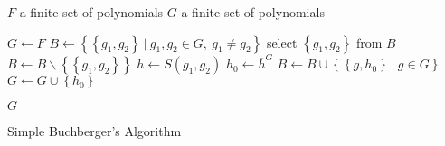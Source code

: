\begin{algorithm}[ht]
  \begin{algorithmic}[1]
    \Require
      \Statex $F$ a finite set of polynomials
    \Ensure
      \Statex $G$ a finite set of polynomials
      \Statex

    \State $G \gets F$
    \State $B \gets \left\{\left\{g_1, g_2\right\}\ |\ g_1, g_2 \in G,\ g_1 \neq g_2\right\}$
      \State select $\left\{g_1, g_2\right\}$ from $B$
      \State $B \gets B\backslash\left\{\left\{g_1, g_2\right\}\right\}$
      \State $h \gets S(g_1, g_2)$
      \State $h_0 \gets \overline{h}^G$
        \State $B \gets B \cup \left\{\left\{g, h_0\right\}\ |\ g\in G\right\}$
        \State $G \gets G \cup \left\{h_0\right\}$
      \EndIf
    \EndWhile

    \State \Return $G$

  \end{algorithmic}
  \caption{Simple Buchberger's Algorithm}
\end{algorithm}

